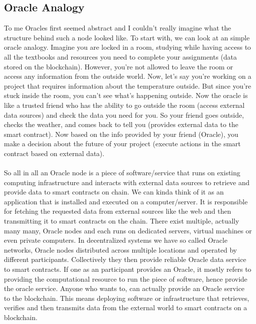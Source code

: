 \documentclass{article}
\begin{document}
\subsection{Oracle Analogy}
To me Oracles first seemed abstract and I couldn't really imagine what the structure behind such a node looked like. To start with, we can look at an simple oracle analogy. Imagine you are locked in a room, studying while having access to all the textbooks and resources you need to complete your assignments (data stored on the blockchain). However, you're not allowed to leave the room or access any information from the outside world. Now, let's say you're working on a project that requires information about the temperature outside. But since you're stuck inside the room, you can't see what's happening outside. Now the oracle is like a trusted friend who has the ability to go outside the room (access external data sources) and check the data you need for you. So your friend goes outside, checks the weather, and comes back to tell you (provides external data to the smart contract). Now based on the info provided by your friend (Oracle), you make a decision about the future of your project (execute actions in the smart contract based on external data).
\\
\\
So all in all an Oracle node is a piece of software/service that runs on existing computing infrastructure and interacts with external data sources to retrieve and provide data to smart contracts on chain. We can kinda think of it as an application that is installed and executed on a computer/server. It is responsible for fetching the requested data from external sources like the web and then transmitting it to smart contracts on the chain. There exist multiple, actually many many, Oracle nodes and each runs on dedicated servers, virtual machines or even private computers. In decentralized systems we have so called Oracle networks, Oracle nodes distributed across multiple locations and operated by different participants. Collectively they then provide reliable Oracle data service to smart contracts. If one as an participant provides an Oracle, it mostly refers to providing the computational resource to run the piece of software, hence provide the oracle service. Anyone who wants to, can actually provide an Oracle service to the blockchain. This means deploying software or infrastructure that retrieves, verifies and then transmits data from the external world to smart contracts on a blockchain. 
\end{document}
